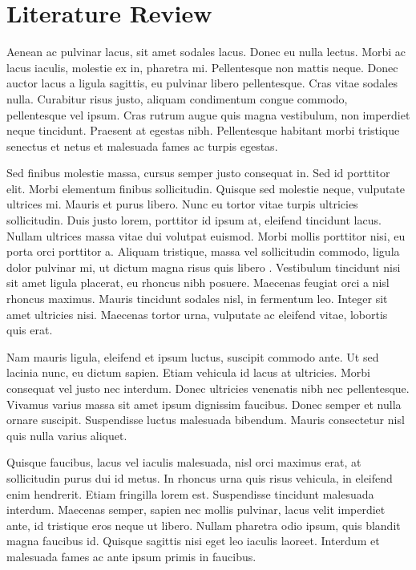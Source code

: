 \chapter{Literature Review}\label{cpt:lr}

Aenean ac pulvinar lacus, sit amet sodales lacus. Donec eu nulla lectus. Morbi ac lacus iaculis, molestie ex in, pharetra mi. Pellentesque non mattis neque. Donec auctor lacus a ligula sagittis, eu pulvinar libero pellentesque. Cras vitae sodales nulla. Curabitur risus justo, aliquam condimentum congue commodo, pellentesque vel ipsum. Cras rutrum augue quis magna vestibulum, non imperdiet neque tincidunt. Praesent at egestas nibh. Pellentesque habitant morbi tristique senectus et netus et malesuada fames ac turpis egestas.

Sed finibus molestie massa, cursus semper justo consequat in. Sed id porttitor elit. Morbi elementum finibus sollicitudin. Quisque sed molestie neque, vulputate ultrices mi. Mauris et purus libero. Nunc eu tortor vitae turpis ultricies sollicitudin. Duis justo lorem, porttitor id ipsum at, eleifend tincidunt lacus. Nullam ultrices massa vitae dui volutpat euismod. Morbi mollis porttitor nisi, eu porta orci porttitor a. Aliquam tristique, massa vel sollicitudin commodo, ligula dolor pulvinar mi, ut dictum magna risus quis libero \cite{bibname}. Vestibulum tincidunt nisi sit amet ligula placerat, eu rhoncus nibh posuere. Maecenas feugiat orci a nisl rhoncus maximus. Mauris tincidunt sodales nisl, in fermentum leo. Integer sit amet ultricies nisi. Maecenas tortor urna, vulputate ac eleifend vitae, lobortis quis erat.

Nam mauris ligula, eleifend et ipsum luctus, suscipit commodo ante. Ut sed lacinia nunc, eu dictum sapien. Etiam vehicula id lacus at ultricies. Morbi consequat vel justo nec interdum. Donec ultricies venenatis nibh nec pellentesque. Vivamus varius massa sit amet ipsum dignissim faucibus. Donec semper et nulla ornare suscipit. Suspendisse luctus malesuada bibendum. Mauris consectetur nisl quis nulla varius aliquet.

Quisque faucibus, lacus vel iaculis malesuada, nisl orci maximus erat, at sollicitudin purus dui id metus. In rhoncus urna quis risus vehicula, in eleifend enim hendrerit. Etiam fringilla lorem est. Suspendisse tincidunt malesuada interdum. Maecenas semper, sapien nec mollis pulvinar, lacus velit imperdiet ante, id tristique eros neque ut libero. Nullam pharetra odio ipsum, quis blandit magna faucibus id. Quisque sagittis nisi eget leo iaculis laoreet. Interdum et malesuada fames ac ante ipsum primis in faucibus.

